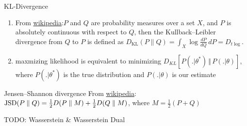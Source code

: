 \begin{definition}{KL-Divergence}
	\begin{enumerate}
		\item From \href{https://en.wikipedia.org/wiki/Divergence_(statistics)}{wikipedia}:$P$ and $Q$ are probability measures over a set $X$, and $P$ is absolutely continuous with respect to $Q$, then the Kullback–Leibler divergence from $Q$ to $P$ is defined as
		$D_{\mathrm {KL} }(P\|Q)=\int _{X}\log {\frac {dP}{dQ}}\,dP=D_{t\log}$.
		\item maxmizing likelihood is equivalent to minimizing $D_{KL}[P(. \vert \theta^{\ast}) \, \Vert \, P(. \vert \theta)]$, where $P(. \vert \theta^{\ast})$ is the true distribution and $P(. \vert \theta)$ is our estimate
	\end{enumerate}
\end{definition}

\begin{definition}{Jensen–Shannon divergence}
	From \href{https://en.wikipedia.org/wiki/Jensen–Shannon_divergence}{wikipedia}:${{\rm {JSD}}}(P\parallel Q)={\frac  {1}{2}}D(P\parallel M)+{\frac  {1}{2}}D(Q\parallel M)$, where $M={\frac  {1}{2}}(P+Q)$
\end{definition}

TODO: Wasserstein \& Wasserstein Dual